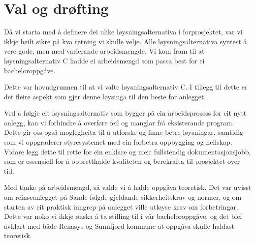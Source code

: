 \section{Val og drøfting}

Då vi starta med å definere dei ulike løysningsalternativa i forprosjektet, var vi
ikkje heilt sikre på kva retning vi skulle velje. Alle løysningsalternativa syntest å vere gode,
men med varierande arbeidsmengde. Vi kom fram til at løysningsalternativ C hadde ei arbeidsmengd
som passa best for ei bacheloroppgåve.

Dette var hovudgrunnen til at vi valte løysningsalternativ C.
I tillegg til dette er det fleire aspekt som gjer denne løysinga til den beste for anlegget.

Ved å følgje eit løysningsalternativ som bygger på ein arbeidsprosess for eit nytt anlegg, 
kan vi forhindre å overføre feil og manglar frå eksisterande program. 
Dette gir oss også moglegheita til å utforske og finne betre løysningar, 
samtidig som vi oppgraderer styresystemet med ein forbetra oppbygging og heilskap.
Vidare legg dette til rette for ein enklare og meir fullstendig dokumentasjonsjobb, 
som er essensiell for å oppretthalde kvaliteten og berekrafta til prosjektet over tid.

Med tanke på arbeidsmengd, så valde vi å halde oppgåva teoretisk.
Det var uvisst om reinseanlegget på Sande følgde gjeldande sikkerheitskrav og normer,
og om starten av eit praktisk inngrep på anlegget ville utløyse krav om forbetringar.
Dette var noko vi ikkje ønska å ta stilling til i vår bacheloroppgåve, og det blei avklart
med både Renasys og Sunnfjord kommune at oppgåva skulle haldast teoretisk.

